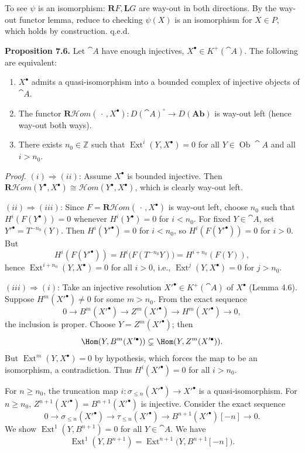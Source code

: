 To see \(\psi\) is an isomorphism: \(\mathbf{R}F,\mathbf{L}G\) are way-out in both directions. By the way-out functor lemma, reduce to checking \(\psi(X)\) is an isomorphism for \(X\in P\), which holds by construction. q.e.d.

\setcounter{page}{80}
\textbf{Proposition 7.6.}
Let \(\cat{A}\) have enough injectives, \(X^\bullet\in K^+(\cat{A})\). The following are equivalent:
\begin{enumerate}
\item[(i)] \(X^\bullet\) admits a quasi-isomorphism into a bounded complex of injective objects of \(\cat{A}\).
\item[(ii)] The functor \(\mathbf{R}\mathcal{H}\textit{om}(\,\cdot\,,X^\bullet)\colon D(\cat{A})^\circ\to D(\mathbf{Ab})\) is way-out left (hence way-out both ways).
\item[(iii)] There exists \(n_0\in\mathbb{Z}\) such that \(\operatorname{Ext}^i(Y,X^\bullet)=0\) for all \(Y\in\operatorname{Ob}\cat{A}\) and all \(i>n_0\).
\end{enumerate}

\textit{Proof.}
\((i)\Rightarrow(ii)\): Assume \(X^\bullet\) is bounded injective. Then \(\mathbf{R}\mathcal{H}\textit{om}(Y^\bullet,X^\bullet)\cong\mathcal{H}\textit{om}(Y^\bullet,X^\bullet)\), which is clearly way-out left.

\((ii)\Rightarrow(iii)\): Since \(F=\mathbf{R}\mathcal{H}\textit{om}(\,\cdot\,,X^\bullet)\) is way-out left, choose \(n_0\) such that \(H^i(F(Y^\bullet))=0\) whenever \(H^i(Y^\bullet)=0\) for \(i<n_0\).
For fixed \(Y\in\cat{A}\), set \(Y'^\bullet = T^{-n_0}(Y)\). Then \(H^i(Y'^\bullet)=0\) for \(i<n_0\), so \(H^i(F(Y'^\bullet))=0\) for \(i>0\). But
\[
H^i(F(Y'^\bullet))=H^i\big(F(T^{-n_0}Y)\big)=H^{i+n_0}(F(Y)),
\]
hence \(\operatorname{Ext}^{i+n_0}(Y,X^\bullet)=0\) for all \(i>0\), i.e., \(\operatorname{Ext}^j(Y,X^\bullet)=0\) for \(j>n_0\).

\setcounter{page}{81}
\((iii)\Rightarrow(i)\): Take an injective resolution \(X'^\bullet\in K^+(\cat{A})\) of \(X^\bullet\) (Lemma 4.6). Suppose \(H^m(X'^\bullet)\neq0\) for some \(m>n_0\). From the exact sequence
\[
0\to B^m(X'^\bullet)\to Z^m(X'^\bullet)\to H^m(X'^\bullet)\to 0,
\]
the inclusion is proper. Choose \(Y=Z^m(X'^\bullet)\); then
\[
\Hom(Y,B^m(X'^\bullet))\subsetneq \Hom(Y,Z^m(X'^\bullet)).
\]
But \(\operatorname{Ext}^m(Y,X^\bullet)=0\) by hypothesis, which forces the map to be an isomorphism, a contradiction. Thus \(H^i(X'^\bullet)=0\) for all \(i>n_0\).

\setcounter{page}{82}
For \(n\ge n_0\), the truncation map \(i\colon\sigma_{\le n}(X'^\bullet)\to X'^\bullet\) is a quasi-isomorphism.
For \(n\ge n_0\), \(Z^{n+1}(X'^\bullet)=B^{n+1}(X'^\bullet)\) is injective.
Consider the exact sequence
\[
0\to\sigma_{\le n}(X'^\bullet)\to\tau_{\le n}(X'^\bullet)\to B^{n+1}(X'^\bullet)[-n]\to 0.
\]
We show \(\operatorname{Ext}^1(Y,B^{n+1})=0\) for all \(Y\in\cat{A}\). We have
\[
\operatorname{Ext}^1(Y,B^{n+1})
=\operatorname{Ext}^{n+1}\big(Y,B^{n+1}[-n]\big).
\]

